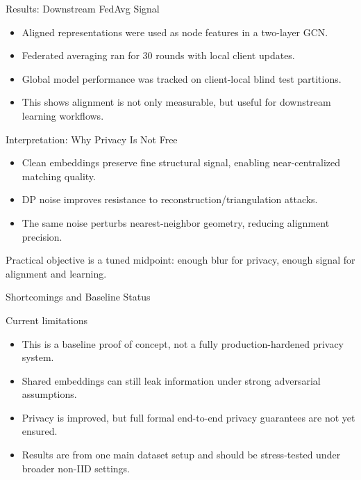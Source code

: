 \documentclass[11pt, aspectratio=169]{beamer}
\begin{document}
\begin{frame}{Results: Downstream FedAvg Signal}
    \begin{itemize}
        \item Aligned representations were used as node features in a two-layer GCN.
        \item Federated averaging ran for 30 rounds with local client updates.
        \item Global model performance was tracked on client-local blind test partitions.
        \item This shows alignment is not only measurable, but useful for downstream learning workflows.
    \end{itemize}
\end{frame}

\begin{frame}{Interpretation: Why Privacy Is Not Free}
    \begin{itemize}
        \item Clean embeddings preserve fine structural signal, enabling near-centralized matching quality.
        \item DP noise improves resistance to reconstruction/triangulation attacks.
        \item The same noise perturbs nearest-neighbor geometry, reducing alignment precision.
    \end{itemize}
    \vspace{0.2cm}
    Practical objective is a tuned midpoint: enough blur for privacy, enough signal for alignment and learning.
\end{frame}

\begin{frame}{Shortcomings and Baseline Status}
    \begin{block}{Current limitations}
        \begin{itemize}
            \item This is a baseline proof of concept, not a fully production-hardened privacy system.
            \item Shared embeddings can still leak information under strong adversarial assumptions.
            \item Privacy is improved, but full formal end-to-end privacy guarantees are not yet ensured.
            \item Results are from one main dataset setup and should be stress-tested under broader non-IID settings.
        \end{itemize}
    \end{block}
\end{frame}
\end{document}
